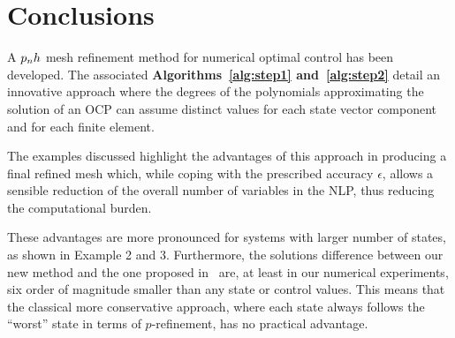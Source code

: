 \section*{Conclusions}
A $p_{n}h$ mesh refinement method for numerical optimal control has been developed. The associated {\bf Algorithms~\ref{alg:step1} and~\ref{alg:step2}} detail an innovative approach where the degrees of the polynomials approximating the solution of an OCP can assume distinct values for each state vector component and for each finite element.

The examples discussed highlight the advantages of this approach in producing a final refined mesh which, while coping with the prescribed accuracy $\epsilon$, allows a sensible reduction of the overall number of variables in the NLP, thus reducing the computational burden.

These advantages are more pronounced for systems with larger number of states, as shown in Example 2 and 3.
Furthermore, the solutions difference between our new method and the one proposed in~\cite{Patterson:OCAM:2015} are, at least in our numerical experiments, six order of magnitude smaller than any state or control values. This means that the classical more conservative approach, where each state always follows the ``worst'' state in terms of $p$-refinement, has no practical advantage.

